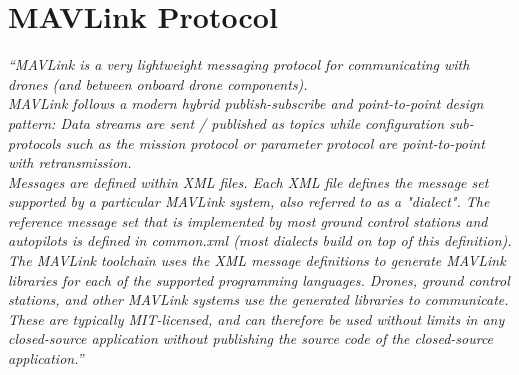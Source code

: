 
\chapter{MAVLink Protocol} %
\label{appendix:mavlink}
\textit{“MAVLink is a very lightweight messaging protocol for communicating with drones (and between onboard drone components).\\
MAVLink follows a modern hybrid publish-subscribe and point-to-point design pattern: Data streams are sent / published as topics while configuration sub-protocols such as the mission protocol or parameter protocol are point-to-point with retransmission.\\
Messages are defined within XML files. Each XML file defines the message set supported by a particular MAVLink system, also referred to as a "dialect". The reference message set that is implemented by most ground control stations and autopilots is defined in common.xml (most dialects build on top of this definition).\\
The MAVLink toolchain uses the XML message definitions to generate MAVLink libraries for each of the supported programming languages. Drones, ground control stations, and other MAVLink systems use the generated libraries to communicate. These are typically MIT-licensed, and can therefore be used without limits in any closed-source application without publishing the source code of the closed-source application.”} \cite{Mavlink}
